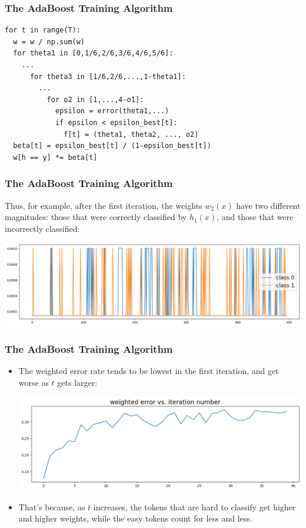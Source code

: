 \documentclass{beamer}
\begin{document}
\begin{frame}[fragile]
  \frametitle{The AdaBoost Training Algorithm}

\begin{lstlisting}
for t in range(T):
  w = w / np.sum(w)
  for theta1 in [0,1/6,2/6,3/6,4/6,5/6]:
    ...
      for theta3 in [1/6,2/6,...,1-theta1]:
        ...
          for o2 in [1,...,4-o1]:
            epsilon = error(theta1,...)
            if epsilon < epsilon_best[t]:
              f[t] = (theta1, theta2, ..., o2)
  beta[t] = epsilon_best[t] / (1-epsilon_best[t])
  w[h == y] *= beta[t]
\end{lstlisting}

\end{frame}


\begin{frame}
  \frametitle{The AdaBoost Training Algorithm}

  Thus, for example, after the first iteration, the weights $w_2(x)$
  have two different magnitudes: those that were correctly classified
  by $h_1(x)$, and those that were incorrectly classified:
  \centerline{\includegraphics[width=\textwidth]{figs/weights_after_1_iteration.png}}
\end{frame}

\begin{frame}
  \frametitle{The AdaBoost Training Algorithm}
  
  \begin{itemize}
  \item The weighted error rate tends to be lowest in the first
    iteration, and get worse as $t$ gets larger:
    
    \centerline{\includegraphics[width=\textwidth]{figs/weightederror_vs_iterationnumber.png}}
  \item That's because, as $t$ increases, the tokens that are hard to
    classify get higher and higher weights, while the easy tokens
    count for less and less.
  \end{itemize}
\end{frame}
\end{document}
